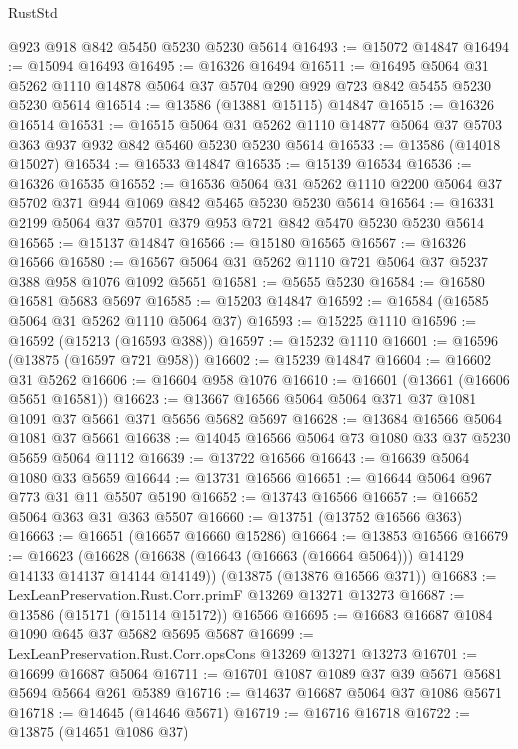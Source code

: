 \begin{lexlean}{RustStd}
\begin{coremodule}
    @923
    @918
    @842
    @5450
    @5230
    @5230
    @5614
@16493 := @15072 @14847
@16494 := @15094 @16493
@16495 := @16326 @16494
@16511 := @16495
    @5064
    @31
    @5262
    @1110
    @14878
    @5064
    @37
    @5704
    @290
    @929
    @723
    @842
    @5455
    @5230
    @5230
    @5614
@16514 := @13586 (@13881 @15115) @14847
@16515 := @16326 @16514
@16531 := @16515
    @5064
    @31
    @5262
    @1110
    @14877
    @5064
    @37
    @5703
    @363
    @937
    @932
    @842
    @5460
    @5230
    @5230
    @5614
@16533 := @13586 (@14018 @15027)
@16534 := @16533 @14847
@16535 := @15139 @16534
@16536 := @16326 @16535
@16552 := @16536
    @5064
    @31
    @5262
    @1110
    @2200
    @5064
    @37
    @5702
    @371
    @944
    @1069
    @842
    @5465
    @5230
    @5230
    @5614
@16564 := @16331 @2199 @5064 @37 @5701 @379 @953 @721 @842 @5470 @5230 @5230 @5614
@16565 := @15137 @14847
@16566 := @15180 @16565
@16567 := @16326 @16566
@16580 := @16567 @5064 @31 @5262 @1110 @721 @5064 @37 @5237 @388 @958 @1076 @1092 @5651
@16581 := @5655 @5230
@16584 := @16580 @16581 @5683 @5697
@16585 := @15203 @14847
@16592 := @16584 (@16585 @5064 @31 @5262 @1110 @5064 @37)
@16593 := @15225 @1110
@16596 := @16592 (@15213 (@16593 @388))
@16597 := @15232 @1110
@16601 := @16596 (@13875 (@16597 @721 @958))
@16602 := @15239 @14847
@16604 := @16602 @31 @5262
@16606 := @16604 @958 @1076
@16610 := @16601 (@13661 (@16606 @5651 @16581))
@16623 := @13667 @16566 @5064 @5064 @371 @37 @1081 @1091 @37 @5661 @371 @5656 @5682 @5697
@16628 := @13684 @16566 @5064 @1081 @37 @5661
@16638 := @14045 @16566 @5064 @73 @1080 @33 @37 @5230 @5659 @5064 @1112
@16639 := @13722 @16566
@16643 := @16639 @5064 @1080 @33 @5659
@16644 := @13731 @16566
@16651 := @16644 @5064 @967 @773 @31 @11 @5507 @5190
@16652 := @13743 @16566
@16657 := @16652 @5064 @363 @31 @363 @5507
@16660 := @13751 (@13752 @16566 @363)
@16663 := @16651 (@16657 @16660 @15286)
@16664 := @13853 @16566
@16679 := @16623
    (@16628 (@16638 (@16643 (@16663 (@16664 @5064))) @14129 @14133 @14137 @14144 @14149))
    (@13875 (@13876 @16566 @371))
@16683 := LexLeanPreservation.Rust.Corr.primF @13269 @13271 @13273
@16687 := @13586 (@15171 (@15114 @15172)) @16566
@16695 := @16683 @16687 @1084 @1090 @645 @37 @5682 @5695 @5687
@16699 := LexLeanPreservation.Rust.Corr.opsCons @13269 @13271 @13273
@16701 := @16699 @16687 @5064
@16711 := @16701 @1087 @1089 @37 @39 @5671 @5681 @5694 @5664 @261 @5389
@16716 := @14637 @16687 @5064 @37 @1086 @5671
@16718 := @14645 (@14646 @5671)
@16719 := @16716 @16718
@16722 := @13875 (@14651 @1086 @37)

\end{coremodule}
\end{lexlean}
